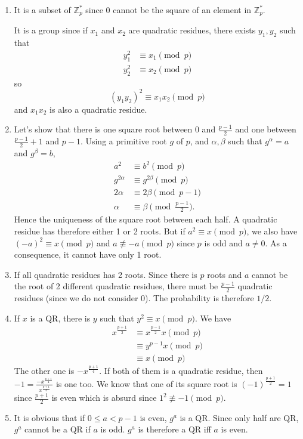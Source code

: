 \begin{solution}
	\begin{enumerate}
		\item
		It is a subset of $\mathbb{Z}_p^*$ since $0$
		cannot be the square of an element in $\mathbb{Z}_p^*$.
		
		It is a group since if $x_1$ and $x_2$ are quadratic residues,
		there exists $y_1,y_2$ such that
		\begin{align*}
			y_1^2 & \equiv x_1 \pmod{p}\\
			y_2^2 & \equiv x_2 \pmod{p}
		\end{align*}
		so
		\[ (y_1y_2)^2 \equiv x_1x_2 \pmod{p} \]
		and $x_1x_2$ is also a quadratic residue.
		\item
		Let's show that there is one square root between $0$ and $\frac{p-1}{2}$ and one between $\frac{p-1}{2}+1$ and $p-1$.
		Using a primitive root $g$ of $p$, and $\alpha,\beta$ such that $g^\alpha = a$ and $g^\beta = b$,
		\begin{align*}
			a^2 & \equiv b^2 \pmod{p}\\
			g^{2\alpha} & \equiv g^{2\beta} \pmod{p}\\
			2\alpha & \equiv 2\beta \pmod{p-1}\\
			\alpha & \equiv \beta \pmod{\frac{p-1}{2}}.
		\end{align*}
		Hence the uniqueness of the square root between each half.
		A quadratic residue has therefore either 1 or 2 roots.
		But if $a^2 \equiv x \pmod{p}$, we also have $(-a)^2 \equiv x \pmod{p}$ and $a \not\equiv -a \pmod{p}$ since $p$ is odd and $a \neq 0$.
		As a consequence, it cannot have only 1 root.
		\item
		If all quadratic residues has 2 roots.
		Since there is $p$ roots and $a$ cannot be the root of 2 different quadratic residues,
		there must be $\frac{p-1}{2}$ quadratic residues (since we do not consider 0).
		The probability is therefore $1/2$.
		\item
		If $x$ is a QR, there is $y$ such that $y^2 \equiv x \pmod{p}$.
		We have
		\begin{align*}
			x^{\frac{p+1}{2}}
			& \equiv x^{\frac{p-1}{2}}x \pmod{p}\\
			& \equiv y^{p-1}x \pmod{p}\\
			& \equiv x \pmod{p}
		\end{align*}
		The other one is $-x^{\frac{p+1}{4}}$.
		If both of them is a quadratic residue, then $-1 = \frac{-x^{\frac{p+1}{4}}}{x^{\frac{p+1}{4}}}$ is one too.
		We know that one of its square root is $(-1)^{\frac{p+1}{2}} = 1$ since $\frac{p+1}{2}$ is even which is absurd
		since $1^2 \not\equiv -1 \pmod{p}$.
		\item
		It is obvious that if $0 \leq a < p-1$ is even, $g^a$ is a QR.
		Since only half are QR, $g^a$ cannot be a QR if $a$ is odd.
		$g^a$ is therefore a QR iff $a$ is even.
		

\end{enumerate}
\end{solution}
